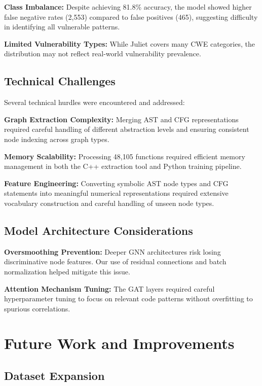 \textbf{Class Imbalance:} Despite achieving 81.8\% accuracy, the model showed higher false negative rates (2,553) compared to false positives (465), suggesting difficulty in identifying all vulnerable patterns.

\textbf{Limited Vulnerability Types:} While Juliet covers many CWE categories, the distribution may not reflect real-world vulnerability prevalence.

\subsection{Technical Challenges}

Several technical hurdles were encountered and addressed:

\textbf{Graph Extraction Complexity:} Merging AST and CFG representations required careful handling of different abstraction levels and ensuring consistent node indexing across graph types.

\textbf{Memory Scalability:} Processing 48,105 functions required efficient memory management in both the C++ extraction tool and Python training pipeline.

\textbf{Feature Engineering:} Converting symbolic AST node types and CFG statements into meaningful numerical representations required extensive vocabulary construction and careful handling of unseen node types.

\subsection{Model Architecture Considerations}

\textbf{Oversmoothing Prevention:} Deeper GNN architectures risk losing discriminative node features. Our use of residual connections and batch normalization helped mitigate this issue.

\textbf{Attention Mechanism Tuning:} The GAT layers required careful hyperparameter tuning to focus on relevant code patterns without overfitting to spurious correlations.

\section{Future Work and Improvements}

\subsection{Dataset Expansion}


